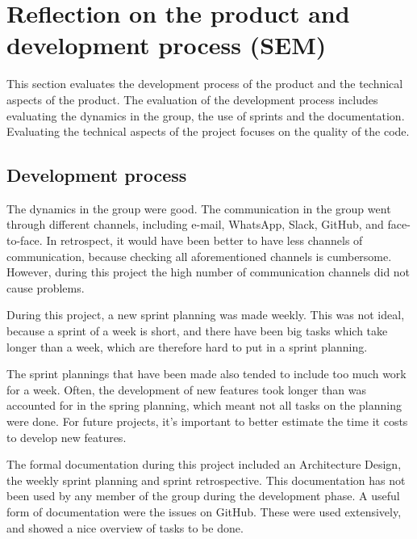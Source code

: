 \chapter{Reflection on the product and development process (SEM)}
This section evaluates the development process of the product and the technical aspects of the product. The evaluation of the development process includes evaluating the dynamics in the group, the use of sprints and the documentation. Evaluating the technical aspects of the project focuses on the quality of the code. 

\section{Development process}
\par
The dynamics in the group were good. The communication in the group went through different channels, including e-mail, WhatsApp, Slack, GitHub, and face-to-face. In retrospect, it would have been better to have less channels of communication, because checking all aforementioned channels is cumbersome. However, during this project the high number of communication channels did not cause problems. 
\par
During this project, a new sprint planning was made weekly. This was not ideal, because a sprint of a week is short, and there have been big tasks which take longer than a week, which are therefore hard to put in a sprint planning. 
\par
The sprint plannings that have been made also tended to include too much work for a week. Often, the development of new features took longer than was accounted for in the spring planning, which meant not all tasks on the planning were done. For future projects, it’s important to better estimate the time it costs to develop new features.
\par
The formal documentation during this project included an Architecture Design, the weekly sprint planning and sprint retrospective. This documentation has not been used by any member of the group during the development phase. A useful form of documentation were the issues on GitHub. These were used extensively, and showed a nice overview of tasks to be done. 

